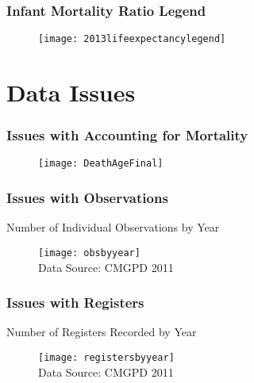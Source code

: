 \begin{frame}[label=2013lifeexpectancylegend]
\frametitle{Infant Mortality Ratio Legend  \hyperlink{2013lifeexpectancy}{}}
\begin{figure}[h!]
\texttt{[image: 2013lifeexpectancylegend]}\\
{\tiny }

\end{figure}

\end{frame}


\section{Data Issues}

\begin{frame}[label = ageofdeath]
\frametitle{Issues with Accounting for Mortality \hyperlink{data2}{}}
\begin{figure}[h!]
\texttt{[image: DeathAgeFinal]}\\
{\tiny }

\end{figure}

\end{frame}

\begin{frame}[label = obsbyyear]
\frametitle{Issues with Observations \hyperlink{data2}{}}
Number of Individual Observations by Year
\begin{figure}[h!]
\texttt{[image: obsbyyear]}\\
{\tiny Data Source: CMGPD 2011}

\end{figure}

\end{frame}

\begin{frame}[label = obsbyyear]
\frametitle{Issues with Registers \hyperlink{data2}{}}
Number of Registers Recorded by Year
\begin{figure}[h!]
\texttt{[image: registersbyyear]}\\
{\tiny Data Source: CMGPD 2011}

\end{figure}

\end{frame}



